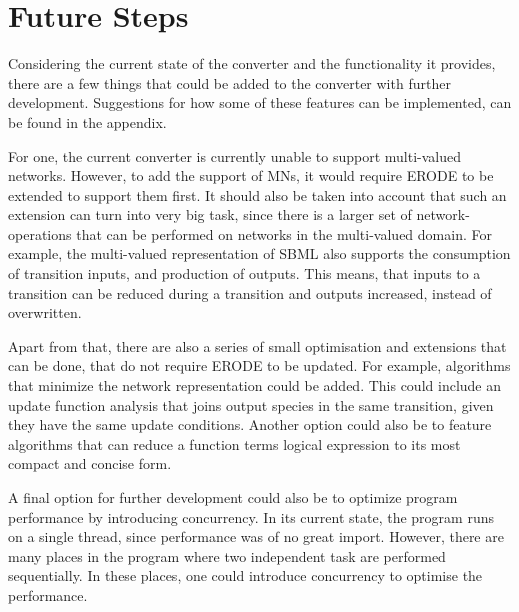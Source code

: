 \chapter{Future Steps}
Considering the current state of the converter and the functionality it provides, there are a few things that could be added to the converter with further development. Suggestions for how some of these features can be implemented, can be found in the appendix.

For one, the current converter is currently unable to support multi-valued networks. However, to add the support of MNs, it would require ERODE to be extended to support them first. It should also be taken into account that such an extension can turn into very big task, since there is a larger set of network-operations that can be performed on networks in the multi-valued domain. For example, the multi-valued representation of SBML also supports the consumption of transition inputs, and production of outputs. This means, that inputs to a transition can be reduced during a transition and outputs increased, instead of overwritten.

Apart from that, there are also a series of small optimisation and extensions that can be done, that do not require ERODE to be updated. For example, algorithms that minimize the network representation could be added. This could include an update function analysis that joins output species in the same transition, given they have the same update conditions.
Another option could also be to feature algorithms that can reduce a function terms logical expression to its most compact and concise form.

A final option for further development could also be to optimize program performance by introducing concurrency. In its current state, the program runs on a single thread, since performance was of no great import. However, there are many places in the program where two independent task are performed sequentially. In these places, one could introduce concurrency to optimise the performance.